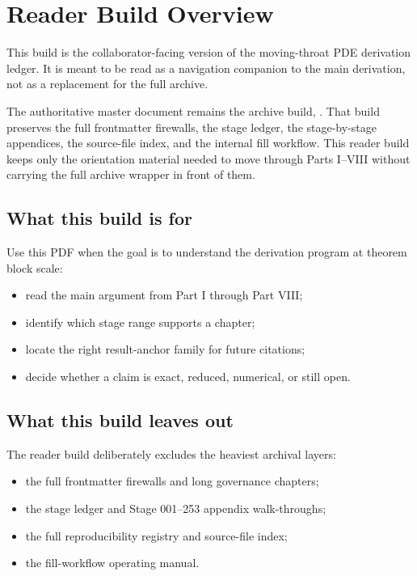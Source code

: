 \chapter{Reader Build Overview}
\label{chap:reader-overview}

This build is the collaborator-facing version of the moving-throat PDE
derivation ledger. It is meant to be read as a navigation companion to the
main derivation, not as a replacement for the full archive.

The authoritative master document remains the archive build,
. That build preserves the full frontmatter
firewalls, the stage ledger, the stage-by-stage appendices, the source-file
index, and the internal fill workflow. This reader build keeps only the
orientation material needed to move through Parts I--VIII without carrying the
full archive wrapper in front of them.

\section{What this build is for}

Use this PDF when the goal is to understand the derivation program at theorem
block scale:
\begin{itemize}[leftmargin=2.2em]
  \item read the main argument from Part I through Part VIII;
  \item identify which stage range supports a chapter;
  \item locate the right result-anchor family for future citations;
  \item decide whether a claim is exact, reduced, numerical, or still open.
\end{itemize}

\section{What this build leaves out}

The reader build deliberately excludes the heaviest archival layers:
\begin{itemize}[leftmargin=2.2em]
  \item the full frontmatter firewalls and long governance chapters;
  \item the stage ledger and Stage 001--253 appendix walk-throughs;
  \item the full reproducibility registry and source-file index;
  \item the fill-workflow operating manual.
\end{itemize}

